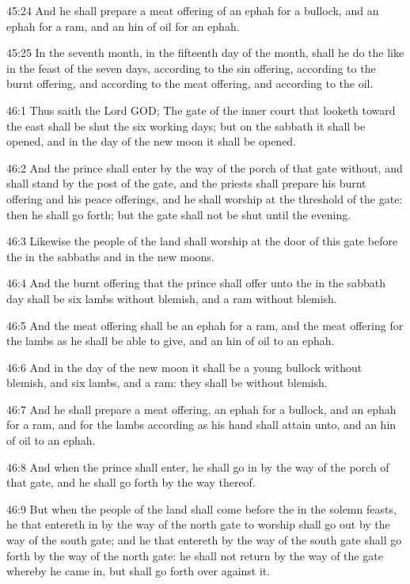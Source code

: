 45:24 And he shall prepare a meat offering of an ephah for a bullock,
and an ephah for a ram, and an hin of oil for an ephah.

45:25 In the seventh month, in the fifteenth day of the month, shall
he do the like in the feast of the seven days, according to the sin
offering, according to the burnt offering, and according to the meat
offering, and according to the oil.

46:1 Thus saith the Lord GOD; The gate of the inner court that looketh
toward the east shall be shut the six working days; but on the sabbath
it shall be opened, and in the day of the new moon it shall be opened.

46:2 And the prince shall enter by the way of the porch of that gate
without, and shall stand by the post of the gate, and the priests
shall prepare his burnt offering and his peace offerings, and he shall
worship at the threshold of the gate: then he shall go forth; but the
gate shall not be shut until the evening.

46:3 Likewise the people of the land shall worship at the door of this
gate before the \LORD in the sabbaths and in the new moons.

46:4 And the burnt offering that the prince shall offer unto the \LORD
in the sabbath day shall be six lambs without blemish, and a ram
without blemish.

46:5 And the meat offering shall be an ephah for a ram, and the meat
offering for the lambs as he shall be able to give, and an hin of oil
to an ephah.

46:6 And in the day of the new moon it shall be a young bullock
without blemish, and six lambs, and a ram: they shall be without
blemish.

46:7 And he shall prepare a meat offering, an ephah for a bullock, and
an ephah for a ram, and for the lambs according as his hand shall
attain unto, and an hin of oil to an ephah.

46:8 And when the prince shall enter, he shall go in by the way of the
porch of that gate, and he shall go forth by the way thereof.

46:9 But when the people of the land shall come before the \LORD in the
solemn feasts, he that entereth in by the way of the north gate to
worship shall go out by the way of the south gate; and he that
entereth by the way of the south gate shall go forth by the way of the
north gate: he shall not return by the way of the gate whereby he came
in, but shall go forth over against it.

